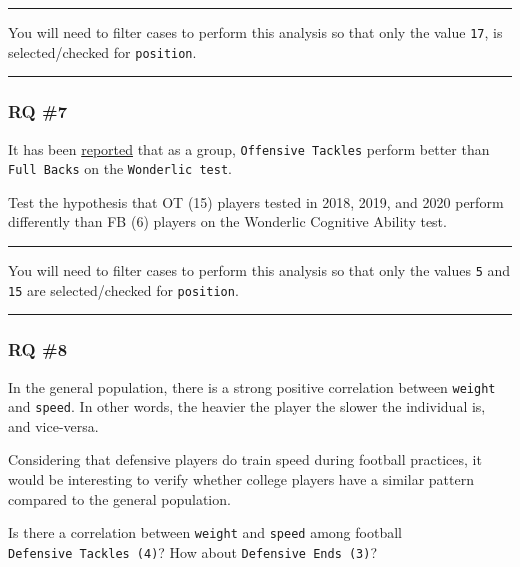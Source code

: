 \documentclass[
]{article}
\begin{document}
\begin{center}\rule{0.5\linewidth}{0.5pt}\end{center}

You will need to filter cases to perform this analysis so that only the value \texttt{17}, is selected/checked for \texttt{position}.

\begin{center}\rule{0.5\linewidth}{0.5pt}\end{center}

\hypertarget{rq-7}{%
\subsubsection{RQ \#7}\label{rq-7}}

It has been \href{https://www.cbssports.com/nfl/news/nfl-draft-combine-the-highest-and-lowest-wonderlic-test-scores-ever-recorded/}{reported} that as a group, \texttt{Offensive\ Tackles} perform better than \texttt{Full\ Backs} on the \texttt{Wonderlic\ test}.

Test the hypothesis that OT (15) players tested in 2018, 2019, and 2020 perform differently than FB (6) players on the Wonderlic Cognitive Ability test.

\begin{center}\rule{0.5\linewidth}{0.5pt}\end{center}

You will need to filter cases to perform this analysis so that only the values \texttt{5} and \texttt{15} are selected/checked for \texttt{position}.

\begin{center}\rule{0.5\linewidth}{0.5pt}\end{center}

\hypertarget{rq-8}{%
\subsubsection{RQ \#8}\label{rq-8}}

In the general population, there is a strong positive correlation between \texttt{weight} and \texttt{speed}. In other words, the heavier the player the slower the individual is, and vice-versa.

Considering that defensive players do train speed during football practices, it would be interesting to verify whether college players have a similar pattern compared to the general population.

Is there a correlation between \texttt{weight} and \texttt{speed} among football \texttt{Defensive\ Tackles\ (4)}? How about \texttt{Defensive\ Ends\ (3)}?
\end{document}
